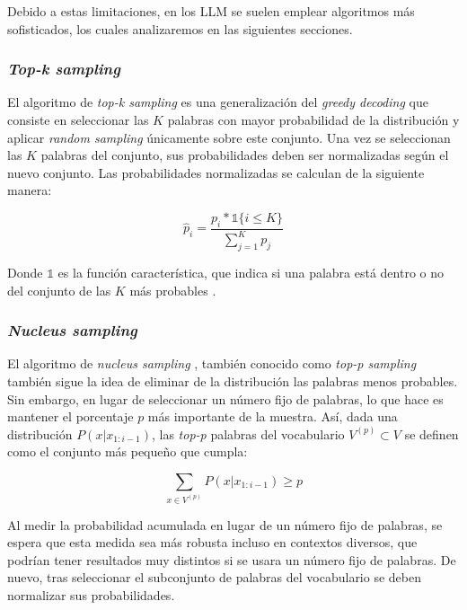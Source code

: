 \documentclass[11pt,spanish,listoffigures,listoftables]{tfgetsinf}
\begin{document}
Debido a estas limitaciones, en los LLM se suelen emplear algoritmos más sofisticados, los cuales analizaremos en las siguientes secciones.

\subsubsection{\textit{Top-k sampling}}

El algoritmo de \textit{top-k sampling} es una generalización del \textit{greedy decoding} que consiste en seleccionar las $K$ palabras con mayor probabilidad de la distribución y aplicar \textit{random sampling} únicamente sobre este conjunto. Una vez se seleccionan las $K$ palabras del conjunto, sus probabilidades deben ser normalizadas según el nuevo conjunto. Las probabilidades normalizadas se calculan de la siguiente manera:

\begin{equation}
\hat{p}_i = \frac{p_i * \mathbb{1}\{i \leq K\}}{\sum_{j = 1}^K p_j}
\end{equation}

Donde $\mathbb{1}$ es la función característica, que indica si una palabra está dentro o no del conjunto de las $K$ más probables \cite{nadeem2020systematiccharacterizationsamplingalgorithms}.

\subsubsection{\textit{Nucleus sampling}}

El algoritmo de \textit{nucleus sampling} \cite{holtzman2020curiouscaseneuraltext}, también conocido como \textit{top-p sampling} también sigue la idea de eliminar de la distribución las palabras menos probables. Sin embargo, en lugar de seleccionar un número fijo de palabras, lo que hace es mantener el porcentaje $p$ más importante de la muestra. Así, dada una distribución $P(x |x_{1:i-1})$, las \textit{top-p} palabras del vocabulario $V^{(p)} \subset V$ se definen como el conjunto más pequeño que cumpla:

\begin{equation}
\sum_{x \in V^{(p)}} P(x | x_{1:i-1}) \ge p
\end{equation}

Al medir la probabilidad acumulada en lugar de un número fijo de palabras, se espera que esta medida sea más robusta incluso en contextos diversos, que podrían tener resultados muy distintos si se usara un número fijo de palabras. De nuevo, tras seleccionar el subconjunto de palabras del vocabulario se deben normalizar sus probabilidades.
\end{document}
